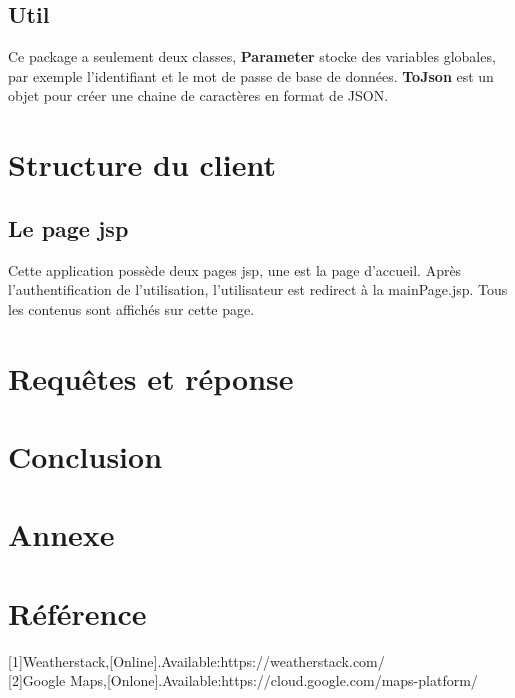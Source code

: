 \documentclass[14px]{article}
\begin{document}
\subsection{Util}
Ce package a seulement deux classes, \textbf{Parameter} stocke des variables globales, par exemple l'identifiant et le mot de passe de base de données. \textbf{ToJson} est un objet pour créer une chaine de caractères en format de JSON.


\section{Structure du client}
\subsection{Le page jsp}
Cette application possède deux pages jsp, une est la page d'accueil. Après l'authentification de l'utilisation, l'utilisateur est redirect à la mainPage.jsp. Tous les contenus sont affichés sur cette page.




\section{Requêtes et réponse}

\section{Conclusion}


\section{Annexe}
\begin{figure}
\end{figure}
\section{Référence}
[1]Weatherstack,[Online].Available:https://weatherstack.com/\\

[2]Google Maps,[Onlone].Available:https://cloud.google.com/maps-platform/\\
\end{document}
